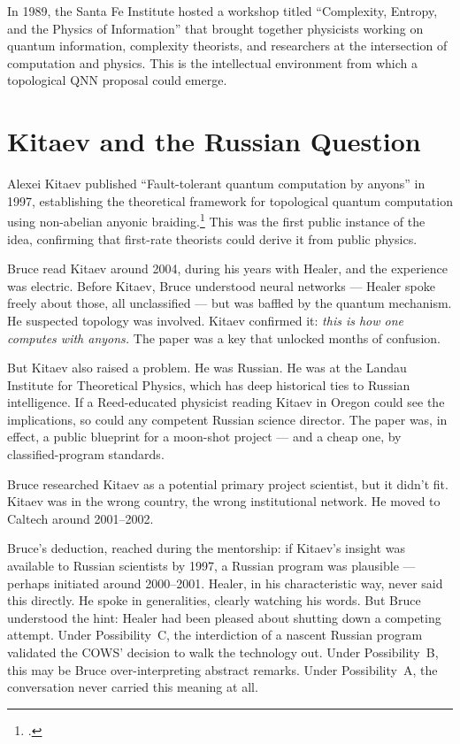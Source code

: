 In 1989, the Santa Fe Institute hosted a workshop titled ``Complexity, Entropy, and the Physics of Information'' that brought together physicists working on quantum information, complexity theorists, and researchers at the intersection of computation and physics. This is the intellectual environment from which a topological QNN proposal could emerge.

\section*{Kitaev and the Russian Question}
\label{spine:braid-kitaev-and-the-russian-question}

Alexei Kitaev published ``Fault-tolerant quantum computation by anyons'' in 1997, establishing the theoretical framework for topological quantum computation using non-abelian anyonic braiding.\footcite{kitaev2003} This was the first public instance of the idea, confirming that first-rate theorists could derive it from public physics.

Bruce read Kitaev around 2004, during his years with Healer, and the experience was electric. Before Kitaev, Bruce understood neural networks --- Healer spoke freely about those, all unclassified --- but was baffled by the quantum mechanism. He suspected topology was involved. Kitaev confirmed it: \textit{this is how one computes with anyons.} The paper was a key that unlocked months of confusion.

But Kitaev also raised a problem. He was Russian. He was at the Landau Institute for Theoretical Physics, which has deep historical ties to Russian intelligence. If a Reed-educated physicist reading Kitaev in Oregon could see the implications, so could any competent Russian science director. The paper was, in effect, a public blueprint for a moon-shot project --- and a cheap one, by classified-program standards.

Bruce researched Kitaev as a potential primary project scientist, but it didn't fit. Kitaev was in the wrong country, the wrong institutional network. He moved to Caltech around 2001--2002.

Bruce's deduction, reached during the mentorship: if Kitaev's insight was available to Russian scientists by 1997, a Russian program was plausible --- perhaps initiated around 2000--2001. Healer, in his characteristic way, never said this directly. He spoke in generalities, clearly watching his words. But Bruce understood the hint: Healer had been pleased about shutting down a competing attempt. Under Possibility~C, the interdiction of a nascent Russian program validated the COWS' decision to walk the technology out. Under Possibility~B, this may be Bruce over-interpreting abstract remarks. Under Possibility~A, the conversation never carried this meaning at all.

